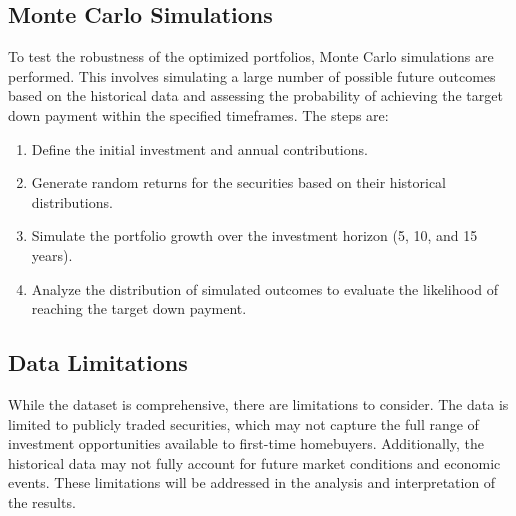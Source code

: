 \subsection{Monte Carlo Simulations}
To test the robustness of the optimized portfolios, Monte Carlo simulations are performed. This involves simulating a large number of possible future outcomes based on the historical data and assessing the probability of achieving the target down payment within the specified timeframes. The steps are:
\begin{enumerate}
    \item Define the initial investment and annual contributions.
    \item Generate random returns for the securities based on their historical distributions.
    \item Simulate the portfolio growth over the investment horizon (5, 10, and 15 years).
    \item Analyze the distribution of simulated outcomes to evaluate the likelihood of reaching the target down payment.
\end{enumerate}

\subsection{Data Limitations}
While the dataset is comprehensive, there are limitations to consider. The data is limited to publicly traded securities, which may not capture the full range of investment opportunities available to first-time homebuyers. Additionally, the historical data may not fully account for future market conditions and economic events. These limitations will be addressed in the analysis and interpretation of the results.
